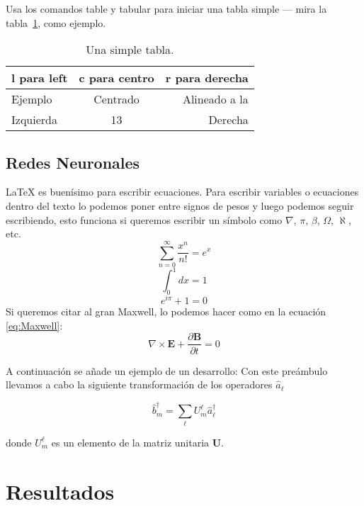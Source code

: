 \documentclass[12pt]{article}
\begin{document}
Usa los comandos table y tabular para iniciar una tabla simple --- mira la tabla~\ref{tab:tabla ejemplo}, como ejemplo. 

\begin{table}
\centering
\begin{tabular}{l c r} 
l para left & c para centro & r para derecha \\ \hline
Ejemplo & Centrado & Alineado a la\\
Izquierda & 13 & Derecha
\end{tabular}
\caption{\label{tab:tabla ejemplo}Una simple tabla.}
\end{table}

\subsection{Redes Neuronales}

\LaTeX{} es buenísimo para escribir ecuaciones. Para escribir variables o ecuaciones dentro del texto lo podemos poner entre signos de pesos y luego podemos seguir escribiendo, esto funciona si queremos escribir un símbolo como $\nabla$, $\pi$, $\beta$, $\Omega$, $\aleph$, etc.
\begin{equation}
\sum_{n=0}^\infty \frac{x^n}{n!}=e^x
\end{equation}
\begin{equation}
\int_{0}^{1}dx=1
\end{equation}
\begin{equation}
e^{i\pi}+1=0
\end{equation}
Si queremos citar al gran Maxwell, lo podemos hacer como en la ecuación \ref{eq:Maxwell}:
\begin{equation}
\nabla\times\mathbf{E}+\frac{\partial\mathbf{B}}{\partial t}=0\label{eq:Maxwell}
\end{equation}

A continuación se añade un ejemplo de un desarrollo:
Con este preámbulo llevamos a cabo la siguiente transformación de los operadores $\hat{a}_{\ell}$

\begin{equation}
\hat{b}_{m}^{\dagger}=\sum_{\ell}U_{m}^{\ell}\hat{a}_{\ell}^{\dagger}
\end{equation}

donde $U_{m}^{\ell}$ es un elemento de la matriz unitaria $\mathbf{U}$.



\section{Resultados}
\end{document}
